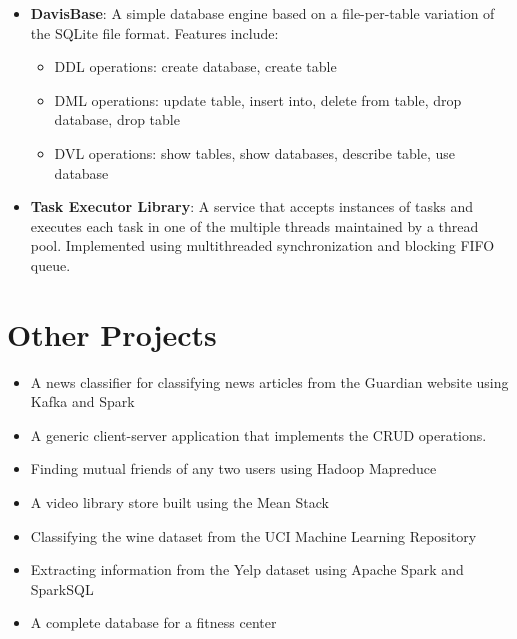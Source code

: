 \documentclass[letterpaper,11pt]{article}
\begin{document}
\begin{itemize}[noitemsep,nolistsep,leftmargin=*]
\item \textbf{DavisBase}: A simple database engine based on a file-per-table variation of the SQLite file format. Features include:
 \begin{itemize}[noitemsep,nolistsep,leftmargin=*]
\item DDL operations: create database, create table 
 \item DML operations: update table, insert into, delete from table, drop database, drop table
 \item DVL operations: show tables, show databases, describe table, use database
      \end{itemize}

\item \textbf{Task Executor Library}: A service that accepts instances of tasks and executes each task in one of the multiple threads maintained by a thread pool. Implemented using multithreaded synchronization and blocking FIFO queue.
 \end{itemize}
     

 
\section{Other Projects}

\begin{itemize}[noitemsep,nolistsep,leftmargin=*]
\item A news classifier for classifying news articles from the Guardian website using Kafka and Spark
\item A generic client-server application that implements the CRUD operations.  
\item Finding mutual friends of any two users using Hadoop Mapreduce
\item A video library store built using the Mean Stack
\item Classifying the wine dataset from the UCI Machine Learning Repository
\item Extracting information from the Yelp dataset using Apache Spark and SparkSQL
\item A complete database for a fitness center 
\end{itemize}


 

 
 
 
\end{document}
